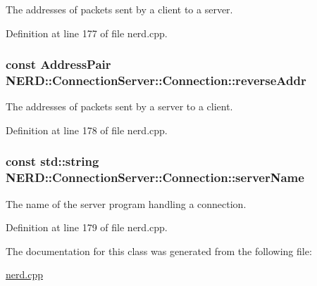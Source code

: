 \-The addresses of packets sent by a client to a server. 



\-Definition at line 177 of file nerd.\-cpp.

\hypertarget{classNERD_1_1ConnectionServer_1_1Connection_add4fb710d6212e0f8501bb2bb29b523d}{
\subsubsection[{reverse\-Addr}]{\setlength{\rightskip}{0pt plus 5cm}const {\bf \-Address\-Pair} {\bf \-N\-E\-R\-D\-::\-Connection\-Server\-::\-Connection\-::reverse\-Addr}}}
\label{classNERD_1_1ConnectionServer_1_1Connection_add4fb710d6212e0f8501bb2bb29b523d}


\-The addresses of packets sent by a server to a client. 



\-Definition at line 178 of file nerd.\-cpp.

\hypertarget{classNERD_1_1ConnectionServer_1_1Connection_ac2d5abf39fc698fd831419e20bbc0eba}{
\subsubsection[{server\-Name}]{\setlength{\rightskip}{0pt plus 5cm}const std\-::string {\bf \-N\-E\-R\-D\-::\-Connection\-Server\-::\-Connection\-::server\-Name}}}
\label{classNERD_1_1ConnectionServer_1_1Connection_ac2d5abf39fc698fd831419e20bbc0eba}


\-The name of the server program handling a connection. 



\-Definition at line 179 of file nerd.\-cpp.



\-The documentation for this class was generated from the following file\-:\begin{DoxyCompactItemize}
\item 
\hyperlink{nerd_8cpp}{nerd.\-cpp}\end{DoxyCompactItemize}
